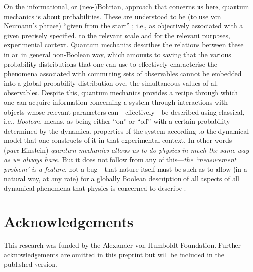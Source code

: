 \documentclass[12pt,english,twoside]{article}
\numberwithin{equation}{section}
\begin{document}
On the informational, or (neo-)Bohrian, approach that concerns us here, quantum mechanics is about probabilities. These are understood to be (to use von Neumann's phrase) ``given from the start'' \citep[quoted in][p. x]{bubForewordToRaffles}; i.e., as objectively associated with a given precisely specified, to the relevant scale and for the relevant purposes, experimental  context. Quantum mechanics describes the relations between these in an in general non-Boolean way, which amounts to saying that the various probability distributions that one can use to effectively characterise the phenomena associated with commuting sets of observables cannot be embedded into a global probability distribution over the simultaneous values of all observables. Despite this, quantum mechanics provides a recipe through which one can acquire information concerning a system through interactions with objects whose relevant parameters can---effectively---be described using classical, i.e., \emph{Boolean}, means, as being either ``on'' or ``off'' with a certain probability determined by the dynamical properties of the system according to the dynamical model that one constructs of it in that experimental context. In other words (\emph{pace} Einstein) \emph{quantum mechanics allows us to do physics in much the same way as we always have.} But it does not follow from any of this---\emph{the `measurement problem' is a feature}, not a bug---that nature itself must be such as to allow (in a natural way, at any rate) for a globally Boolean description of all aspects of all dynamical phenomena that physics is concerned to describe \citep[cf.][p. 118]{pitowsky1994}.

\section*{Acknowledgements}

This research was funded by the Alexander von Humboldt Foundation. Further acknowledgements are omitted in this preprint but will be included in the published version. %


{}
\end{document}

